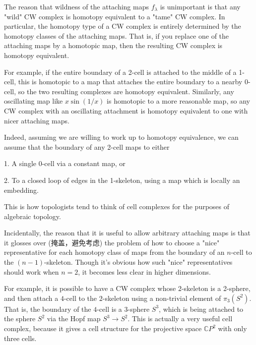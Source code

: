 The reason that wildness of the attaching maps $f_\lambda$ is unimportant is that any "wild" CW complex is homotopy equivalent to a "tame" CW complex.  In particular, the homotopy type of a CW complex is entirely determined by the homotopy classes of the attaching maps. That is, if you replace one of the attaching maps by a homotopic map, then the resulting CW complex is homotopy equivalent.\par

For example, if the entire boundary of a 2-cell is attached to the middle of a 1-cell, this is homotopic to a map that attaches the entire boundary to a nearby 0-cell, so the two resulting complexes are homotopy equivalent.  Similarly, any oscillating map like $x\sin(1/x)$ is homotopic to a more reasonable map, so any CW complex with an oscillating attachment is homotopy equivalent to one with nicer attaching maps.\par

Indeed, assuming we are willing to work up to homotopy equivalence, we can assume that the boundary of any 2-cell maps to either

1. A single 0-cell via a constant map, or

2. To a closed loop of edges in the 1-skeleton, using a map which is locally an embedding.\par

This is how topologists tend to think of cell complexes for the purposes of algebraic topology.\par

Incidentally, the reason that it is useful to allow arbitrary attaching maps is that it glosses over (掩盖，避免考虑) the problem of how to choose a "nice" representative for each homotopy class of maps from the boundary of an $n$-cell to the $(n-1)$-skeleton.  Though it's obvious how such "nice" representatives should work when $n=2$, it becomes less clear in higher dimensions.\par

For example, it is possible to have a CW complex whose $2$-skeleton is a 2-sphere, and then attach a $4$-cell to the $2$-skeleton using a non-trivial element of $\pi_3(S^2)$.  That is, the boundary of the $4$-cell is a $3$-sphere $S^3$, which is being attached to the sphere $S^2$ via the Hopf map $S^3 \to S^2$.  This is actually a very useful cell complex, because it gives a cell structure for the projective space $\mathbb{C}P^2$ with only three cells.\par

